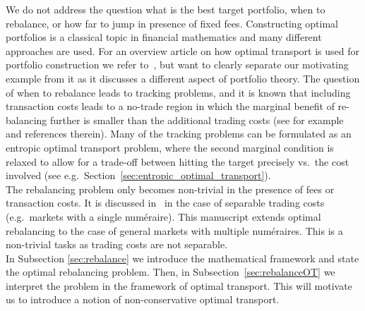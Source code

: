 \documentclass{article}
\theoremstyle{definition}
\begin{document}
We do not address the question what is the best target portfolio, when to rebalance, or how far to jump in presence of fixed fees. Constructing optimal portfolios is a classical topic in financial mathematics and many different approaches are used. For an overview article on how optimal transport is used for portfolio construction we refer to~\cite{wong2019information}, but want to clearly separate our motivating example from it as it discusses a different aspect of portfolio theory. The question of when to rebalance leads to tracking problems, and it is known that including transaction costs leads to a no-trade region in which the marginal benefit of re-balancing further is smaller than the additional trading costs (see for example~\cite{davis1990portfolio,holden2013optimal} and references therein). Many of the tracking problems can be formulated as an entropic optimal transport problem, where the second marginal condition is relaxed to allow for a trade-off between hitting the target precisely vs.~the cost involved (see e.g.~Section~\ref{sec:entropic_optimal_transport}). \\

The rebalancing problem only becomes non-trivial in the presence of fees or transaction costs. It is discussed in~\cite{kabanov2009markets} in the case of separable trading costs (e.g.~markets with a single num\'eraire). This manuscript extends optimal rebalancing to the case of general markets with multiple num\'eraires. This is a non-trivial tasks as trading costs are not separable. \\

In Subsection \ref{sec:rebalance} we introduce the mathematical framework and state the optimal rebalancing problem. Then, in Subsection~\ref{sec:rebalanceOT} we interpret the problem in the framework of optimal transport. This will motivate us to introduce a notion of non-conservative optimal transport. 
\end{document}
